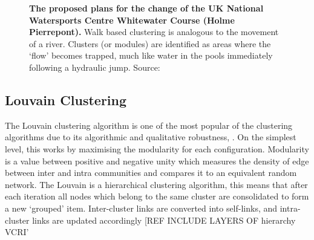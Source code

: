 \begin{figure}[H]
    \centering
\caption{\textbf{The proposed plans for the change of the UK National Watersports Centre Whitewater Course (Holme Pierrepont).} Walk based clustering is analogous to the movement of a river. Clusters (or modules) are identified as areas where the `flow' becomes trapped, much like water in the pools immediately following a hydraulic jump. Source: \cite{hpp} }\label{fig:hpp}
\end{figure}

\subsection{Louvain Clustering}

The Louvain clustering algorithm is one of the most popular of the clustering algorithms due to its algorithmic and qualitative robustness, \citep{loudvain,loudrobust}. On the simplest level, this works by maximising the modularity for each configuration. Modularity is a value between positive and negative unity which measures the density of edge between inter and intra communities and compares it to an equivalent random network.
The Louvain is a hierarchical clustering algorithm, this means that after each iteration all nodes which belong to the same cluster are consolidated to form a new `grouped' item. Inter-cluster links are converted into self-links, and intra-cluster links are updated accordingly [REF INCLUDE LAYERS OF hierarchy VCRI'


